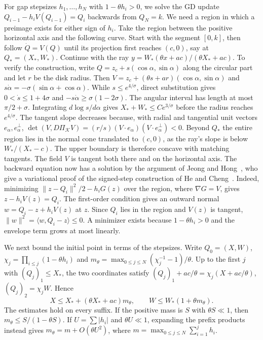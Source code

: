 \documentclass[11pt]{article}
\theoremstyle{definition}
\begin{document}
For gap stepsizes \(h_1,\ldots,h_N\) with \(1-\theta h_i>0\), we solve the GD update \(Q_{i-1}-h_i V(Q_{i-1})=Q_i\) backwards from \(Q_N=k\). We need a region in which a preimage exists for either sign of \(h_i\). Take the region
between the positive horizontal axis and the following curve. Start
with the segment \([0,k]\), then follow \(\dot Q=V(Q)\) until its
projection first reaches \((c,0)\), say at \(Q_*=(X_*,W_*)\). Continue
with the ray
\(y=W_*(\theta x+ac)/(\theta X_*+ac)\).
To verify the construction, write \(Q=z_c+s(\cos\alpha,\sin\alpha)\)
along the circular part and let \(r\) be the disk radius. Then
\(V=z_c+(\theta s+ar)(\cos\alpha,\sin\alpha)\) and
\(s\dot\alpha=-\sigma(\sin\alpha+\cos\alpha)\). While
\(s\le e^{4/\sigma}\), direct substitution gives
\(0<\dot s\le1+4\sigma\) and \(-s\dot\alpha\ge\sigma(1-2\sigma)\).
The angular interval has length at most \(\pi/2+\sigma\). Integrating
\(d\log s/d\alpha\) gives \(X_*+W_*\le C e^{3/\sigma}\) before
the radius reaches \(e^{4/\sigma}\). The tangent slope decreases because,
with radial and tangential unit vectors \(e_\alpha,e_\alpha^\perp\),
\(\det(V,D\Pi_{\mathcal K}V)=(r/s)(V\cdot e_\alpha)
(V\cdot e_\alpha^\perp)<0\). Beyond \(Q_*\) the entire region
lies in the normal cone translated to \((c,0)\), as the ray's slope
is below \(W_* /(X_*-c)\). The upper boundary is therefore concave with matching tangents. The field \(V\) is tangent both there and on the horizontal axis. The
backward equation now has a solution by the argument of Jeong and
Hong~\cite[Lemma~4.3]{JH}, who give a variational proof of the
signed-step construction of He and Cheng~\cite{HC}. Indeed, minimizing
\(\|z-Q_i\|^2/2-h_iG(z)\) over the region, where \(\nabla G=V\),
gives \(z-h_iV(z)=Q_i\). The first-order condition gives an outward normal
\(w=Q_i-z+h_iV(z)\) at \(z\). Since \(Q_i\) lies
in the region and \(V(z)\) is tangent, \(\|w\|^2=\langle w,Q_i-z\rangle\le0\).
A minimizer exists because
\(1-\theta h_i>0\) and the envelope term grows at most linearly.

We next bound the initial point in terms of the stepsizes. Write \(Q_0=(X,W)\), \(\chi_j=\prod_{i\le j}(1-\theta h_i)\) and
\(m_\theta=\max_{0\le j\le N}(\chi_j^{-1}-1)/\theta\). Up to the
first \(j\) with \((Q_j)_1\le X_*\), the two coordinates satisfy
\((Q_j)_1+ac/\theta=\chi_j(X+ac/\theta)\), \((Q_j)_2=\chi_j W\).
Hence
\begin{equation}\label{eq:arc-prefix}
 X\le X_*+(\theta X_*+ac)m_\theta,\qquad
 W\le W_*(1+\theta m_\theta).
\end{equation}
The estimates hold on every suffix. If the positive mass is \(S\)
with \(\theta S\ll1\), then \(m_\theta\le S/(1-\theta S)\). If
\(U=\sum|h_i|\) and \(\theta U\ll1\), expanding the prefix products
instead gives \(m_\theta=m+O(\theta U^2)\), where \(m=\max_{0\le j\le N}\sum_{i=1}^j h_i\).
\end{document}
